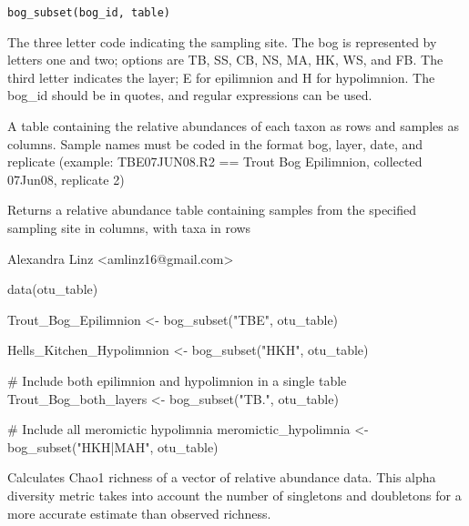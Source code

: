\documentclass[a4paper]{book}
\begin{document}
%
\begin{Usage}
\begin{verbatim}
bog_subset(bog_id, table)
\end{verbatim}
\end{Usage}
%
\begin{Arguments}
\begin{ldescription}
\item[\code{bog\_id}] 
The three letter code indicating the sampling site. The bog is represented by letters one and two; options are TB, SS, CB, NS, MA, HK, WS, and FB. The third letter indicates the layer; E for epilimnion and H for hypolimnion. The bog\_id should be in quotes, and regular expressions can be used.

\item[\code{table}] 
A table containing the relative abundances of each taxon as rows and samples as columns. Sample names must be coded in the format bog, layer, date, and replicate (example: TBE07JUN08.R2 == Trout Bog Epilimnion, collected 07Jun08, replicate 2)

\end{ldescription}
\end{Arguments}
%
\begin{Value}
Returns a relative abundance table containing samples from the specified sampling site in columns, with taxa in rows
\end{Value}
%
\begin{Author}\relax
Alexandra Linz <amlinz16@gmail.com>
\end{Author}
%
\begin{Examples}
\begin{ExampleCode}
data(otu_table)

Trout_Bog_Epilimnion <- bog_subset("TBE", otu_table)

Hells_Kitchen_Hypolimnion <- bog_subset("HKH", otu_table)

# Include both epilimnion and hypolimnion in a single table
Trout_Bog_both_layers <- bog_subset("TB.", otu_table)

# Include all meromictic hypolimnia
meromictic_hypolimnia <- bog_subset("HKH|MAH", otu_table)

\end{ExampleCode}
\end{Examples}
%
\begin{Description}\relax
Calculates Chao1 richness of a vector of relative abundance data. This alpha diversity metric takes into account the number of singletons and doubletons for a more accurate estimate than observed richness.
\end{Description}
\end{document}
